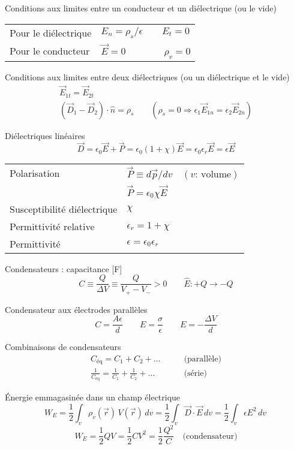 \documentclass[10pt,landscape]{article}
\newcommand{\extraline}{\vspace{1em}}
\newcommand{\halfline}{\vspace{0.5em}}
\newcommand{\tableindent}{\hspace{1.5em}}
\newcommand{\uvec}[1]{\ensuremath{{\hat{#1}}}}
\begin{document}
\begin{multicols}{3}
Conditions aux limites entre un conducteur et un diélectrique  (ou le vide)\\
\halfline
\begin{tabular}{@{\tableindent}ll@{}}
	Pour le diélectrique & $ E_n = {\rho_s}/{\epsilon} \qquad E_t = 0 $ \\
	Pour le conducteur  & $\vec{E} = 0 \qquad\qquad \rho_v = 0 $ \\
\end{tabular}

\extraline
Conditions aux limites entre deux diélectriques (ou un diélectrique et le vide)
\begin{gather*}
\vec{E}_{1t} =\vec{ E}_{2t}  \\
 (\vec{D}_1 - \vec{D}_2) \cdot \uvec{n} = \rho_s  \qquad (\rho_s=0 \Rightarrow \epsilon_1 \vec{E}_{1n} = \epsilon_2 \vec{E}_{2n})
\end{gather*}

\halfline
Diélectriques linéaires
\[ \vec{D} = \epsilon_0\vec{E} + \vec{P} = \epsilon_0(1+\chi)\vec{E} = \epsilon_0\epsilon_r\vec{E} = \epsilon\vec{E}  \]
\begin{tabular}{@{\tableindent}ll@{}}
	Polarisation  & $\vec{P} \equiv d\vec{p}/dv \quad (\text{$v$: volume})$ \\
	  & $\vec{P} = \epsilon_0\chi\vec{E}$ \\
	Susceptibilité diélectrique  & $\chi$ \\
	Permittivité relative &  $\epsilon_r=1+\chi$ \\
	Permittivité & $\epsilon = \epsilon_0\epsilon_r$
\end{tabular}

\extraline
Condensateurs : capacitance [\si{\farad}] 
\[ C \equiv \frac{Q}{\Delta V} \equiv \frac{Q}{V_+ - V_-} > 0 
\qquad \uvec{E}: +Q \to -Q \]

Condensateur aux électrodes parallèles \[ C = \frac{A\epsilon}{d} 
\qquad 
E = \frac{\sigma}{\epsilon}
\qquad
E =  -\frac{\Delta V}{d} \]

Combinaisons de condensateurs \begin{align*}
C_\text{éq} = C_1 + C_2 + \dots  \qquad &\text{(parallèle)} \\
\frac{1}{C_\text{éq}} = \frac{1}{C_1} + \frac{1}{C_2} + \dots \qquad &\text{(série)}
\end{align*}


\halfline
Énergie emmagasinée dans un champ électrique
\[ W_E = \frac{1}{2} \int_v  \rho_v(\vec{r})  \, V(\vec{r}) \, dv 
= \frac{1}{2} \int_v  \vec{D}\cdot\vec{E} \, dv 
= \frac{1}{2} \int_v  \epsilon E^2 \, dv 
\frac{}{}\]
\[ W_E = \frac{1}{2} QV = \frac{1}{2} CV^2 = \frac{1}{2}\frac{Q^2}{C} \quad\text{(condensateur)} \]


\end{multicols}
\end{document}
